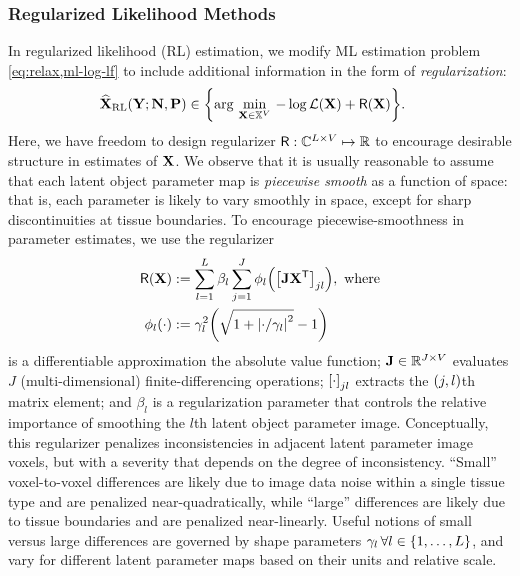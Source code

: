 \subsubsection{Regularized Likelihood Methods}
\label{sss,relax,meth,est,rls}

In regularized likelihood (RL) estimation,
we modify ML estimation problem \eqref{eq:relax,ml-log-lf}
to include additional information
in the form of \emph{regularization}:
\begin{align}
	\estaRL{\bmX}{\bmY; \bmN, \bmP} &\in
	\set{\argmin{\bmX \in \setX^V} -\log{\Lf{\bmX}} + \Rega{\bmX}}.
	\label{eq:relax,rl-est}
\end{align}
Here,
we have freedom to design regularizer 
$\mathsf{R} : \mathbb{C}^{L \times V} \mapsto \mathbb{R}$ 
to encourage desirable structure
in estimates of $\mathbf{X}$. 
We observe
that it is usually reasonable
to assume that each latent object parameter map
is \emph{piecewise smooth} as a function of space:
that is, 
each parameter is likely 
to vary smoothly in space,
except for sharp discontinuities 
at tissue boundaries.
To encourage piecewise-smoothness 
in parameter estimates,
we use the regularizer 
\begin{align}
	\Rega{\bmX} &:= \sum_{l=1}^L \beta_l \sum_{j=1}^J
	\phi_l\paren{\brac{\bmJ\bmX\tpose}_{jl}}, \where
	\label{eq:relax,reg} \\
	\phi_l\paren{\cdot} &:= 
	\gamma_l^2 \paren{\sqrt{1 + \abs{\cdot/\gamma_l}^2} - 1}
\end{align}
is a differentiable approximation
the absolute value function;
$\mathbf{J} \in \mathbb{R}^{J\times V}$ 
evaluates $J$ (multi-dimensional) finite-differencing operations;
$\brac{\cdot}_{jl}$ extracts the $\paren{j,l}$th matrix element;
and $\beta_l$ is a regularization parameter
that controls the relative importance
of smoothing the $l$th latent object parameter image.
Conceptually,
this regularizer penalizes inconsistencies 
in adjacent latent parameter image voxels,
but with a severity that depends
on the degree of inconsistency. 
``Small'' voxel-to-voxel differences 
are likely due to image data noise
within a single tissue type
and are penalized near-quadratically, 
while ``large'' differences
are likely due to tissue boundaries
and are penalized near-linearly.
Useful notions 
of small versus large differences
are governed by shape parameters 
$\gamma_l\, \forall l\in\set{1,\dots,L}$,
and vary for different latent parameter maps
based on their units and relative scale.

